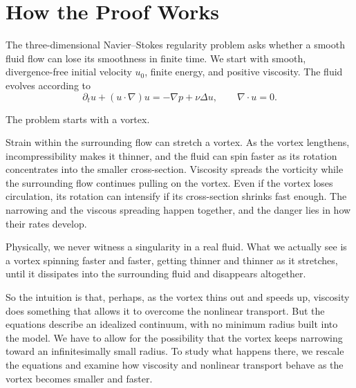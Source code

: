 \begingroup
\setlength{\parindent}{0pt}
\setlength{\parskip}{1.0\baselineskip}
\setlength{\abovedisplayskip}{8pt}
\setlength{\belowdisplayskip}{8pt}
\setlength{\abovedisplayshortskip}{8pt}
\setlength{\belowdisplayshortskip}{8pt}
\setlength{\jot}{5pt}
\makeatletter
\let\NSNativeDisplay\[
\long\def\[#1\]{%
  \par\nobreak\vskip8pt\nointerlineskip
  \begingroup
  \parskip=0pt \predisplaypenalty=10000 \postdisplaypenalty=10000
  \baselineskip=0pt \lineskip=0pt \lineskiplimit=0pt
  \abovedisplayskip=0pt \belowdisplayskip=0pt
  \abovedisplayshortskip=0pt \belowdisplayshortskip=0pt
  \NSNativeDisplay \relax{\normalbaselines #1}\]
  \par
  \endgroup
  \nobreak\vskip8pt\nointerlineskip
  \parskip=0pt
  \AddToHookNext{para/begin}{\ifdefined\NSNativeDisplay\setlength{\parskip}{1.0\baselineskip}\fi}%
  \ignorespaces
}
\makeatother

\section*{How the Proof Works}
\label{guide:how-proof-works}

The three-dimensional Navier--Stokes regularity problem asks whether a smooth fluid flow can lose its smoothness in finite time. We start with smooth, divergence-free initial velocity \(u_0\), finite energy, and positive viscosity. The fluid evolves according to
\[
\partial_tu+(u\cdot\nabla)u=-\nabla p+\nu\Delta u,
\qquad \nabla\cdot u=0.
\]

The problem starts with a vortex.

Strain within the surrounding flow can stretch a vortex. As the vortex lengthens, incompressibility makes it thinner, and the fluid can spin faster as its rotation concentrates into the smaller cross-section. Viscosity spreads the vorticity while the surrounding flow continues pulling on the vortex. Even if the vortex loses circulation, its rotation can intensify if its cross-section shrinks fast enough. The narrowing and the viscous spreading happen together, and the danger lies in how their rates develop.

Physically, we never witness a singularity in a real fluid. What we actually
see is a vortex spinning faster and faster, getting thinner and thinner as
it stretches, until it dissipates into the surrounding fluid and disappears
altogether.

So the intuition is that, perhaps, as the vortex thins out and speeds up,
viscosity does something that allows it to overcome the nonlinear transport.
But the equations describe an idealized continuum, with no minimum radius
built into the model. We have to allow for the possibility that the vortex
keeps narrowing toward an infinitesimally small radius. To study what happens
there, we rescale the equations and examine how viscosity and nonlinear
transport behave as the vortex becomes smaller and faster.

